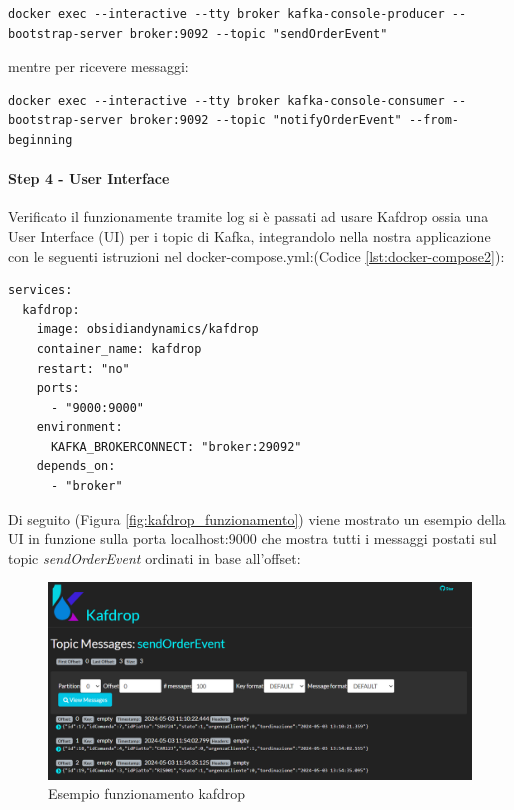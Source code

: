 \begin{lstlisting}[style=terminal, 
    caption={Operazione di post sul topic kafka}, label=lst:postkafka]
docker exec --interactive --tty broker kafka-console-producer --bootstrap-server broker:9092 --topic "sendOrderEvent"
\end{lstlisting}
mentre per ricevere messaggi:
\begin{lstlisting}[style=terminal, 
    caption={Operazione di get sul topic kafka}, label=lst:getkafka]
docker exec --interactive --tty broker kafka-console-consumer --bootstrap-server broker:9092 --topic "notifyOrderEvent" --from-beginning
\end{lstlisting}
\paragraph{Step 4 - User Interface} 
Verificato il funzionamente tramite log si è passati ad usare Kafdrop\cite{kafdrop} ossia una User Interface (UI) per i topic di Kafka, integrandolo nella nostra applicazione con le seguenti istruzioni nel docker-compose.yml:(Codice \vref{lst:docker-compose2}):
\begin{lstlisting}[language=docker-compose, caption={Aggiornamento del docker-compose.yaml perl per Kafdrop}, label=lst:docker-compose2]
services:  
  kafdrop:
    image: obsidiandynamics/kafdrop
    container_name: kafdrop
    restart: "no"
    ports:
      - "9000:9000"
    environment:
      KAFKA_BROKERCONNECT: "broker:29092"
    depends_on:
      - "broker"
\end{lstlisting}
Di seguito (Figura \vref{fig:kafdrop_funzionamento}) viene mostrato un esempio della UI in funzione sulla porta localhost:9000 che mostra tutti i messaggi postati sul topic \textit{sendOrderEvent} ordinati in base all'offset:
\begin{figure}[H]
    \centering
    \includegraphics[width=1\linewidth]{iterazione1//images/kafdrop_esempio_funzionamento.png}
    \caption{Esempio funzionamento kafdrop}
    \label{fig:kafdrop_funzionamento}
\end{figure}
